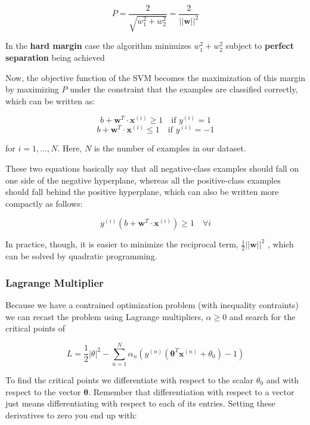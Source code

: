 \documentclass[11pt]{article}
\begin{document}
\[P = \frac{2}{\sqrt{w_1^2+w_2^2}} = \frac{2}{\vert\vert \mathbf{w} \vert\vert^2}\]

In the \textbf{hard margin} case the algorithm minimizes \(w_1^2+w_2^2\)
subject to \textbf{perfect separation} being achieved

Now, the objective function of the SVM becomes the maximization of this
margin by maximizing \(P\) under the constraint that the examples are
classified correctly, which can be written as:

\[b + \mathbf{w}^𝑇 \cdot \mathbf{x}^{(𝑖)} \ge 1 \quad \text{if } 𝑦^{(𝑖)} = 1\]
\[b + \mathbf{w}^𝑇 \cdot \mathbf{x}^{(𝑖)} \le 1 \quad \text{if } 𝑦^{(𝑖)} = -1\]

for \(𝑖 = 1, \dots, 𝑁\). Here, \(N\) is the number of examples in our
dataset.

These two equations basically say that all negative-class examples
should fall on one side of the negative hyperplane, whereas all the
positive-class examples should fall behind the positive hyperplane,
which can also be written more compactly as follows:

\begin{equation}
𝑦^{(𝑖)}\left(b + \mathbf{w}^𝑇 \cdot \mathbf{x}^{(𝑖)}\right) \ge 1 \quad \forall i
\end{equation}

In practice, though, it is easier to minimize the reciprocal term,
\(\frac{1}{2}\vert\vert\mathbf{w}\vert\vert^2\) , which can be solved by
quadratic programming.

    \hypertarget{lagrange-multiplier}{%
\subsubsection{Lagrange Multiplier}\label{lagrange-multiplier}}

Because we have a contrained optimization problem (with inequality
contraints) we can recast the problem using Lagrange multipliers,
\(\alpha \ge 0\) and search for the critical points of

\begin{equation}\label{eq:7.7}
L = \frac{1}{2} \vert \theta \vert^2 - \sum\limits_{n=1}^N \alpha_n \left( y^{(n)} \left( \mathbf{\theta}^T \mathbf{x}^{(n)} + \theta_0 \right) -1 \right)
\end{equation}

To find the critical points we differentiate with respect to the scalar
\(\theta_0\) and with respect to the vector \(\mathbf{\theta}\).
Remember that differentiation with respect to a vector just means
differentiating with respect to each of its entries. Setting these
derivatives to zero you end up with:
\end{document}
